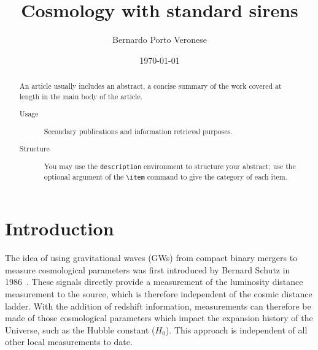 \documentclass[%
preprint,
 amsmath,amssymb,
 aps,
]{revtex4-2}
\begin{document}

\title{Cosmology with standard sirens}

\author{Bernardo Porto Veronese}
%


\date{\today}%

\begin{abstract}
	An article usually includes an abstract, a concise summary of the work
	covered at length in the main body of the article.
	\begin{description}
		\item[Usage] Secondary publications and information retrieval purposes.
		\item[Structure] You may use the \texttt{description} environment to structure your abstract; use the
		      optional argument of the \verb+\item+ command to give the category of each item.
	\end{description}
\end{abstract}

\maketitle


\section{\label{sec:introduction}Introduction} The idea of using gravitational waves (GWs) from compact binary mergers to measure
cosmological parameters was first introduced by Bernard Schutz in 1986~\cite{Schutz:1986gp}. These
signals directly provide a measurement of the luminosity distance measurement to the source, which
is therefore independent of the cosmic distance ladder. With the addition of redshift information,
measurements can therefore be made of those cosmological parameters which impact the expansion
history of the Universe, such as the Hubble constant ($H_0$). This approach is independent of all
other local measurements to date.
\end{document}
